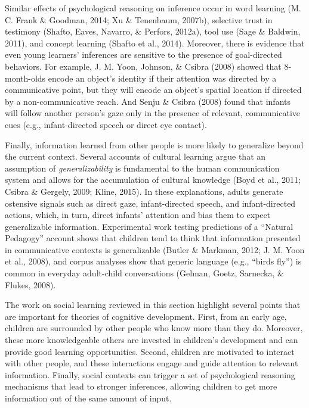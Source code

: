 \documentclass[oneside]{report}
\begin{document}
Similar effects of psychological reasoning on inference occur in word
learning (M. C. Frank \& Goodman, 2014; Xu \& Tenenbaum, 2007b),
selective trust in testimony (Shafto, Eaves, Navarro, \& Perfors,
2012a), tool use (Sage \& Baldwin, 2011), and concept learning (Shafto
et al., 2014). Moreover, there is evidence that even young learners'
inferences are sensitive to the presence of goal-directed behaviors. For
example, J. M. Yoon, Johnson, \& Csibra (2008) showed that 8-month-olds
encode an object's identity if their attention was directed by a
communicative point, but they will encode an object's spatial location
if directed by a non-communicative reach. And Senju \& Csibra (2008)
found that infants will follow another person's gaze only in the
presence of relevant, communicative cues (e.g., infant-directed speech
or direct eye contact).

Finally, information learned from other people is more likely to
generalize beyond the current context. Several accounts of cultural
learning argue that an assumption of \emph{generalizability} is
fundamental to the human communication system and allows for the
accumulation of cultural knowledge (Boyd et al., 2011; Csibra \&
Gergely, 2009; Kline, 2015). In these explanations, adults generate
ostensive signals such as direct gaze, infant-directed speech, and
infant-directed actions, which, in turn, direct infants' attention and
bias them to expect generalizable information. Experimental work testing
predictions of a ``Natural Pedagogy'' account shows that children tend
to think that information presented in communicative contexts is
generalizable (Butler \& Markman, 2012; J. M. Yoon et al., 2008), and
corpus analyses show that generic language (e.g., ``birds fly'') is
common in everyday adult-child conversations (Gelman, Goetz, Sarnecka,
\& Flukes, 2008).

The work on social learning reviewed in this section highlight several
points that are important for theories of cognitive development. First,
from an early age, children are surrounded by other people who know more
than they do. Moreover, these more knowledgeable others are invested in
children's development and can provide good learning opportunities.
Second, children are motivated to interact with other people, and these
interactions engage and guide attention to relevant information.
Finally, social contexts can trigger a set of psychological reasoning
mechanisms that lead to stronger inferences, allowing children to get
more information out of the same amount of input.
\end{document}
